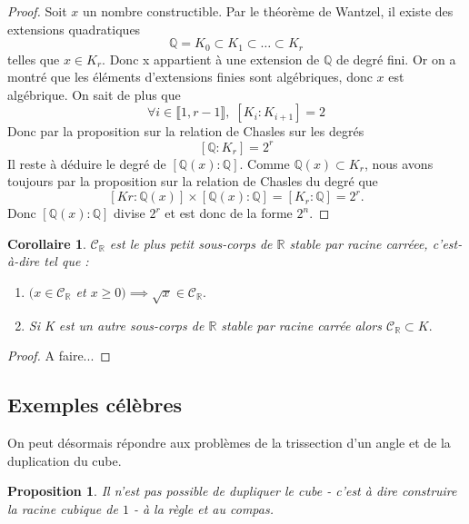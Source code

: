 \documentclass[a4paper,12pt,french]{report}
\newtheorem{proposition}{Proposition}[section]
\newtheorem{corollaire}{Corollaire}[section]
\begin{document}
		     \begin{proof}
		     Soit $x$ un nombre constructible. Par le théorème de Wantzel, il 
		     existe des extensions quadratiques \[ \mathbb{Q} = K_{0} 
		     \subset K_{1} \subset \dots \subset K_{r} \] telles que
		     \(x \in K_{r} \). Donc x appartient à une extension de \( 
		     \mathbb{Q} \) de degré fini. Or on a montré que les éléments d'extensions finies sont algébriques, donc $x$ est algébrique. On sait de plus que 
		     \[ 
		     \forall i \in \llbracket 1, r-1 \rrbracket, \;[K_{i}:K_{i+1}] = 2 
		     \]
		     Donc par la proposition sur 
		     la relation de Chasles sur les degrés \[
		     [\mathbb{Q}:K_{r}] 
		     = 2^{r} \]
		     Il reste à déduire le degré de \( 
		     [\mathbb{Q}(x):\mathbb{Q}] \). Comme \( \mathbb{Q}(x) \subset K_{r} 
		     \), nous avons toujours par la proposition sur la relation 
		     de Chasles du degré que \[ [K{r}:\mathbb{Q}(x)]\times 
		     [\mathbb{Q}(x):\mathbb{Q}] = [K_{r}:\mathbb{Q}] = 2^{r}. 
		     \]
		     Donc \([\mathbb{Q}(x):\mathbb{Q}] \) divise \(2^{r}\) et est donc 
		     de la forme \(2^{n}\).
		     \end{proof} 
		     
		\begin{corollaire}
			 \(\mathscr{C}_{\mathbb{R}} \) est le plus petit sous-corps 
			 de \(\mathbb{R}\) stable par racine carréee, c'est-à-dire 
			 tel que :
			 \begin{enumerate}
			  \item \( (x \in \mathscr{C}_{\mathbb{R}}\) et \(x \geq 0) 
			  \implies \sqrt{x} \in \mathscr{C}_{\mathbb{R}}.\)
			  \item Si K est un autre sous-corps de \(\mathbb{R}\) 
			  stable par racine carrée alors \(\mathscr{C}_{\mathbb{R}} 
			  \subset K.\)
			 \end{enumerate}
		\end{corollaire}
		\begin{proof}
			A faire...
		\end{proof}
		
	
	\subsection{Exemples célèbres}

		On peut désormais répondre aux problèmes de la trissection 
		d'un angle et de la duplication du cube.

	
	\begin{proposition}
		Il n'est pas possible de dupliquer le cube - c'est à dire construire la racine cubique de $1$ - à la règle et au compas.
	\end{proposition}
             
\end{document}
